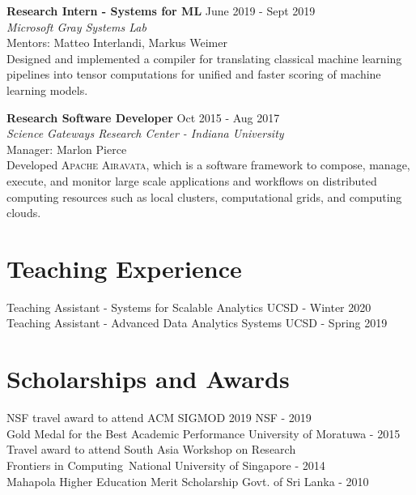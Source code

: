 \documentclass[margin]{res}
\begin{document}
\begin{resume}
\textbf{Research Intern - Systems for ML}
\hfill June 2019 - Sept 2019 \\
\textit{Microsoft Gray Systems Lab} \\
Mentors: Matteo Interlandi, Markus Weimer\\
Designed and implemented a compiler for translating classical machine learning pipelines into tensor computations for unified and faster scoring of machine learning models.


\textbf{Research Software Developer}
\hfill Oct 2015 - Aug 2017 \\
\textit{Science Gateways Research Center - Indiana University} \\
Manager: Marlon Pierce\\
Developed \textsc{Apache Airavata}, which is a software framework to compose, manage, execute, and monitor large scale applications and workflows on distributed computing resources such as local clusters, computational grids, and computing clouds.



\section{Teaching Experience}
Teaching Assistant - Systems for Scalable Analytics \hfill UCSD - Winter 2020\\
Teaching Assistant - Advanced Data Analytics Systems \hfill UCSD - Spring 2019

\section{Scholarships and Awards}
NSF travel award to attend ACM SIGMOD 2019 \hfill NSF - 2019
\\
Gold Medal for the Best Academic Performance \hfill University of Moratuwa - 2015
\\
Travel award to attend South Asia Workshop on Research\\ Frontiers in Computing~\hfill National University of Singapore - 2014
\\
Mahapola Higher Education Merit Scholarship \hfill Govt. of Sri Lanka - 2010



\end{resume}
\end{document}
